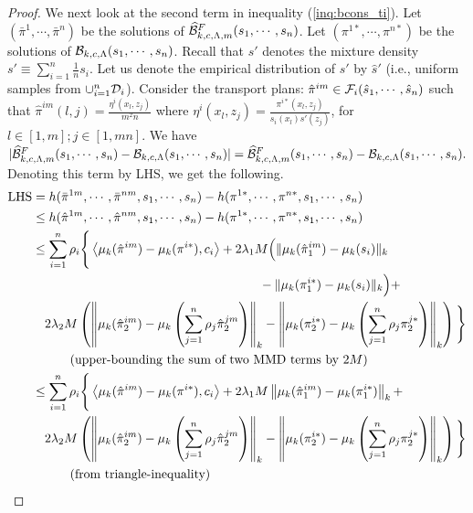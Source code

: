\begin{proof}
We next look at the second term in inequality (\ref{inq:bcons_ti}).
Let $(\bar{\pi}^1, \cdots, \bar{\pi}^n)$ be the solutions of $\widehat{\mathcal{B}}^F_{k,c,\Lambda, m}(s_1, \cdots, s_n)$. Let $(\pi^{1*}, \cdots, \pi^{n*})$ be the solutions of $\mathcal{B}_{k, c, \Lambda}(s_1, \cdots, s_n)$. Recall that $s'$ denotes the mixture density $s'\equiv\sum_{i=1}^n\frac{1}{n}s_i$. Let us denote the empirical distribution of $s'$ by $\hat{s}'$ (i.e., uniform samples from $\cup_{i=1}^n\mathcal{D}_i$). Consider the transport plans: $\hat{\pi}^{im}\in \mathcal{F}_i(\hat{s}_{1}, \cdots, \hat{s}_{n})$ such that $\hat{\pi}^{im}(l, j)=\frac{\eta^i(x_l,z_j)}{m^2n}$ where $\eta^i(x_l,z_j)=\frac{\pi^{i*}(x_l, z_j)}{s_i(x_l)s'(z_j)}$, for $l\in [1, m]; j\in [1, mn]$. \newline
We have $|\widehat{\mathcal{B}}^F_{k,c,\Lambda, m}(s_1, \cdots, s_n)-\mathcal{B}_{k, c, \Lambda}(s_1, \cdots, s_n)|=\widehat{\mathcal{B}}^F_{k,c,\Lambda, m}(s_1, \cdots, s_n)-\mathcal{B}_{k, c, \Lambda}(s_1, \cdots, s_n).$ Denoting this term by LHS, we get the following.
\begin{align*}
    \textup{LHS}
    &=  h(\bar{\pi}^{1m}, \cdots, \bar{\pi}^{nm},s_1, \cdots, s_n) - h(\pi^{1*}, \cdots, \pi^{n*}, s_1, \cdots, s_n)\\
    &\leq h(\hat{\pi}^{1m}, \cdots, \hat{\pi}^{nm},s_1, \cdots, s_n) - h(\pi^{1*}, \cdots, \pi^{n*}, s_1, \cdots, s_n)\\
&\leq \sum_{i=1}^n\rho_i \Bigg\{\left<\mu_k(\hat{\pi}^{im})-\mu_k(\pi^{i*}), c_i\right>+2\lambda_1M\Big(\|\mu_k(\hat{\pi}^{im}_1)-\mu_k(s_i)\|_k\\
    &\qquad\qquad\qquad\qquad\qquad\qquad\qquad\qquad\qquad-\|\mu_k(\pi^{i*}_1)-\mu_k(s_i)\|_k\Big) +\\
    & \quad 2\lambda_2M\left( \left\| \mu_k(\hat{\pi}^{im}_2)-\mu_k\left(\sum_{j=1}^n\rho_j\hat{\pi}^{jm}_2\right)\right\|_k-\left\| \mu_k(\pi^{i*}_2)-\mu_k\left(\sum_{j=1}^n\rho_j\pi^{j*}_2\right)\right\|_k \right)
    \Bigg\}\\
    &\quad \tag{upper-bounding the sum of two MMD terms by $2M$}\\
    &\leq \sum_{i=1}^n\rho_i \Bigg\{\left<\mu_k(\hat{\pi}^{im})-\mu_k(\pi^{i*}), c_i\right>+2\lambda_1M\left\|\mu_k(\hat{\pi}^{im}_1)-\mu_k(\pi^{i*}_1)\right\|_k +\\
    & \quad 2\lambda_2M\left( \left\| \mu_k(\hat{\pi}^{im}_2)-\mu_k\left(\sum_{j=1}^n\rho_j\hat{\pi}^{jm}_2\right)\right\|_k-\left\| \mu_k(\pi^{i*}_2)-\mu_k\left(\sum_{j=1}^n\rho_j\pi^{j*}_2\right)\right\|_k \right)
    \Bigg\}\\
    & \quad \tag{from triangle-inequality} \\

\end{align*}
\end{proof}
